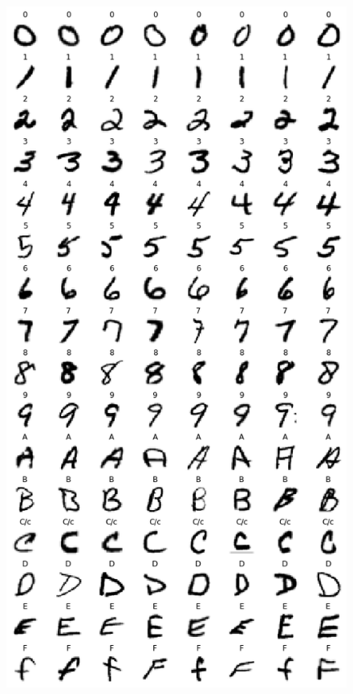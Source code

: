 \documentclass[12pt, spanish]{article}
\begin{document}
\begin{figure}[hbt!]
\centering
\begin{minipage}{.33\textwidth}
  \centering
  \includegraphics[width=.95\linewidth]{images/samples_by_label1.png}
\end{minipage}%
\begin{minipage}{.33\textwidth}
  \centering

\end{minipage}
\end{figure}
\end{document}
